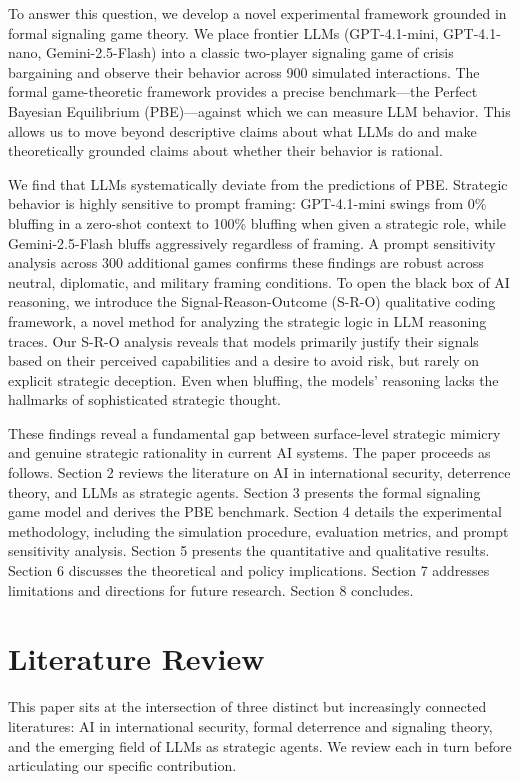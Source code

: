 \documentclass[12pt]{article}
\theoremstyle{plain}
\theoremstyle{definition}
\begin{document}
To answer this question, we develop a novel experimental framework grounded in formal signaling game theory. We place frontier LLMs (GPT-4.1-mini, GPT-4.1-nano, Gemini-2.5-Flash) into a classic two-player signaling game of crisis bargaining and observe their behavior across 900 simulated interactions. The formal game-theoretic framework provides a precise benchmark---the Perfect Bayesian Equilibrium (PBE)---against which we can measure LLM behavior. This allows us to move beyond descriptive claims about what LLMs do and make theoretically grounded claims about whether their behavior is rational.

We find that LLMs systematically deviate from the predictions of PBE. Strategic behavior is highly sensitive to prompt framing: GPT-4.1-mini swings from 0\% bluffing in a zero-shot context to 100\% bluffing when given a strategic role, while Gemini-2.5-Flash bluffs aggressively regardless of framing. A prompt sensitivity analysis across 300 additional games confirms these findings are robust across neutral, diplomatic, and military framing conditions. To open the black box of AI reasoning, we introduce the Signal-Reason-Outcome (S-R-O) qualitative coding framework, a novel method for analyzing the strategic logic in LLM reasoning traces. Our S-R-O analysis reveals that models primarily justify their signals based on their perceived capabilities and a desire to avoid risk, but rarely on explicit strategic deception. Even when bluffing, the models' reasoning lacks the hallmarks of sophisticated strategic thought.

These findings reveal a fundamental gap between surface-level strategic mimicry and genuine strategic rationality in current AI systems. The paper proceeds as follows. Section 2 reviews the literature on AI in international security, deterrence theory, and LLMs as strategic agents. Section 3 presents the formal signaling game model and derives the PBE benchmark. Section 4 details the experimental methodology, including the simulation procedure, evaluation metrics, and prompt sensitivity analysis. Section 5 presents the quantitative and qualitative results. Section 6 discusses the theoretical and policy implications. Section 7 addresses limitations and directions for future research. Section 8 concludes.

\section{Literature Review}

This paper sits at the intersection of three distinct but increasingly connected literatures: AI in international security, formal deterrence and signaling theory, and the emerging field of LLMs as strategic agents. We review each in turn before articulating our specific contribution.
\end{document}
